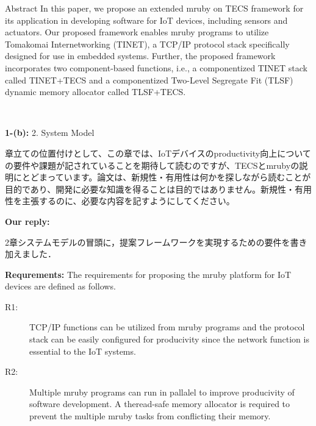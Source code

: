 \documentclass{article}
\begin{document}
\begin{enumerate}
\begin{flushleft}
\begin{itembox}[|]{Abstract}
In this paper, we propose an extended mruby on TECS framework for its application in developing software for IoT devices, including sensors and actuators. Our proposed framework enables mruby programs to utilize Tomakomai Internetworking (TINET), a TCP/IP protocol stack specifically designed for use in embedded systems. Further, the proposed framework incorporates two component-based functions, i.e., a componentized TINET stack called TINET+TECS and a componentized Two-Level Segregate Fit (TLSF) dynamic memory allocator called TLSF+TECS.
\end{itembox}\\

\end{flushleft}

\begin{flushleft}
\textbf{1-(b):} 2. System Model

章立ての位置付けとして、この章では、IoTデバイスのproductivity向上についての要件や課題が記されていることを期待して読むのですが、TECSとmrubyの説明にとどまっています。論文は、新規性・有用性は何かを探しながら読むことが目的であり、開発に必要な知識を得ることは目的ではありません。新規性・有用性を主張するのに、必要な内容を記すようにしてください。
\end{flushleft}
\begin{flushleft}
\textbf{Our reply:}

2章システムモデルの冒頭に，提案フレームワークを実現するための要件を書き加えました．

\begin{itembox}[|]{}
{\bf Requrements:} The requirements for proposing the mruby platform for IoT devices are defined as follows.
\begin{description}
    \item[R1:]
        TCP/IP functions can be utilized from mruby programs and the protocol stack can be easily configured for producivity since the network function is essential to the IoT systems.

    \item[R2:]
        Multiple mruby programs can run in pallalel to improve producivity of software development.
        A theread-safe memory allocator is required to prevent the multiple mruby tasks from conflicting their memory.


\end{description}
\end{itembox}
\end{flushleft}
\end{enumerate}
\end{document}
